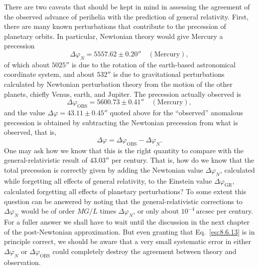 There are two caveats that should be kept in mind in assessing the agreement
of the observed advance of perihelia with the prediction of general
relativity. First, there are many known perturbations that contribute to the
precession of planetary orbits. In particular, Newtonian theory would give
Mercury a precession
\[
  \Delta\varphi_N=5557.62\pm0.20''\quad(\text{Mercury}),
\]
of which about \(5025''\) is due to the rotation of the earth-based
astronomical coordinate system, and about \(532''\) is due to gravitational
perturbations calculated by Newtonian perturbation theory from the motion
of the other planets, chiefly Venus, earth, and Jupiter. The precession
actually observed is
\[
  \Delta\varphi_{\mathrm{OBS}}
  =5600.73\pm0.41''\quad(\text{Mercury}),
\]
and the value \(\Delta\varphi=43.11\pm0.45''\) quoted above for the
``observed'' anomalous precession is obtained by subtracting the Newtonian
precession from what is observed, that is,
\begin{equation}
  \Delta\varphi
  =
  \Delta\varphi_{\mathrm{OBS}}-\Delta\varphi_N.
  \tag{8.6.13}\label{eq:8.6.13}
\end{equation}
One may ask how we know that this is the right quantity to compare with the
general-relativistic result of \(43.03''\) per century. That is, how do we
know that the total precession is correctly given by adding the Newtonian
value \(\Delta\varphi_N\), calculated while forgetting all effects of
general relativity, to the Einstein value \(\Delta\varphi_{\mathrm{GR}}\),
calculated forgetting all effects of planetary perturbations? To some
extent this question can be answered by noting that the general-relativistic
corrections to \(\Delta\varphi_N\) would be of order \(MG/L\) times
\(\Delta\varphi_N\), or only about \(10^{-4}\,\text{arcsec}\) per century.
For a fuller
answer we shall have to wait until the discussion in the next chapter of the
post-Newtonian approximation. But even granting that
Eq.~\eqref{eq:8.6.13} is in principle correct, we should be aware that a
very small systematic error in either \(\Delta\varphi_N\) or
\(\Delta\varphi_{\mathrm{OBS}}\) could completely destroy the agreement
between theory and observation.

